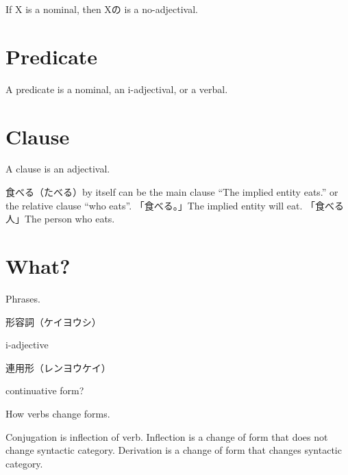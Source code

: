 If X is a nominal, then Xの is a no-adjectival.

\section{Predicate}

A predicate is a nominal, an i-adjectival, or a verbal.

\section{Clause}

A clause is an adjectival.

食べる（たべる）by itself can be the main clause
``The implied entity eats.'' or the relative clause ``who eats''.
「食べる。」The implied entity will eat.
「食べる人」The person who eats.

\section{What?}

Phrases.

形容詞（ケイヨウシ）

i-adjective

連用形（レンヨウケイ）

continuative form?

How verbs change forms.

Conjugation is inflection of verb.
Inflection is a change of form that does not change syntactic category.
Derivation is a change of form that changes syntactic category.
